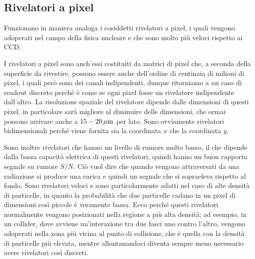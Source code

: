 \subsection{Rivelatori a pixel}

Funzionano in maniera analoga i cosiddetti rivelatori a pixel, i quali vengono adoperati nel campo della fisica nucleare e che sono molto più veloci rispetto ai CCD.

I rivelatori a pixel sono anch'essi costituiti da matrici di pixel che, a seconda della superficie da rivestire, possono essere anche dell'ordine di centinaia di milioni di pixel, i quali però sono dei canali indipendenti, dunque ritorniamo a un caso di readout discreto perché è come se ogni pixel fosse un rivelatore indipendente dall'altro. La risoluzione spaziale del rivelatore dipende dalle dimensioni di questi pixel, in particolare sarà migliore al diminuire delle dimensioni, che ormai possono arrivare anche a $15-20 \, \rm \mu m$ per lato. Sono ovviamente rivelatori bidimensionali perché viene fornita sia la coordinata $x$ che la coordinata $y$.

Sono inoltre rivelatori che hanno un livello di rumore molto basso, il che dipende dalla bassa capacità elettrica di questi rivelatori, quindi hanno un buon rapporto segnale su rumore $S/N$. Ciò vuol dire che quando vengono attraversati da una radiazione si produce una carica e quindi un segnale che si sopraeleva rispetto al fondo. Sono rivelatori veloci e sono particolarmente adatti nel caso di alte densità di particelle, in quanto la probabilità che due particelle cadano in un pixel di dimensioni così piccole è veramente bassa. Ecco perché questi rivelatori normalmente vengono posizionati nella regione a più alta densità; ad esempio, in un collider, dove avviene un'interazione tra due fasci uno contro l'altro, vengono adoperati nella zona più vicina al punto di collisione, che è quella con la densità di particelle più elevata, mentre allontanandoci diventa sempre meno necessario avere rivelatori così discreti.


